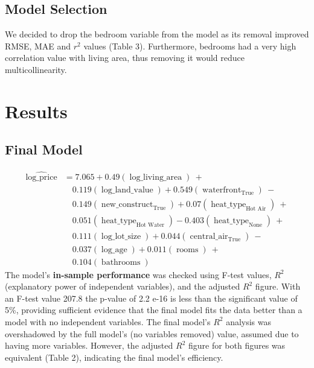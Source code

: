 \documentclass[letterpaper,8pt,twocolumn,twoside,]{pinp}
\begin{document}
\hypertarget{model-selection}{%
\subsection{Model Selection}\label{model-selection}}

We decided to drop the bedroom variable from the model as its removal
improved RMSE, MAE and \(r^2\) values (Table 3). Furthermore, bedrooms
had a very high correlation value with living area, thus removing it
would reduce multicollinearity.

\hypertarget{results}{%
\section{Results}\label{results}}

\hypertarget{final-model}{%
\subsection{Final Model}\label{final-model}}

\begin{equation}
\begin{aligned}
\operatorname{\widehat{log\_price}} &= 7.065 + 0.49(\operatorname{\log\_living\_area})\ + \\
&\quad 0.119(\operatorname{\log\_land\_value}) + 0.549(\operatorname{waterfront}_{\operatorname{True}})\ - \\
&\quad 0.149(\operatorname{new\_construct}_{\operatorname{True}}) + 0.07(\operatorname{heat\_type}_{\operatorname{Hot\ Air}})\ + \\
&\quad 0.051(\operatorname{heat\_type}_{\operatorname{Hot\ Water}}) - 0.403(\operatorname{heat\_type}_{\operatorname{None}})\ + \\
&\quad 0.111(\operatorname{\log\_lot\_size}) + 0.044(\operatorname{central\_air}_{\operatorname{True}})\ - \\
&\quad 0.037(\operatorname{\log\_age}) + 0.011(\operatorname{rooms})\ + \\
&\quad 0.104(\operatorname{bathrooms})
\end{aligned}
\end{equation} The model's \textbf{in-sample performance} was checked
using F-test values, \(R^2\) (explanatory power of independent
variables), and the adjusted \(R^2\) figure. With an F-test value 207.8
the p-value of 2.2 e-16 is less than the significant value of 5\%,
providing sufficient evidence that the final model fits the data better
than a model with no independent variables. The final model's \(R^2\)
analysis was overshadowed by the full model's (no variables removed)
value, assumed due to having more variables. However, the adjusted
\(R^2\) figure for both figures was equivalent (Table 2), indicating the
final model's efficiency.
\end{document}
